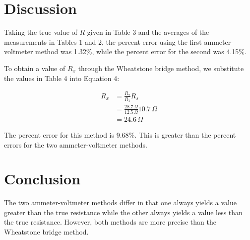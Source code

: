 \documentclass[11pt, titlepage, letterpaper, twoside]{article}
\begin{document}
\section{Discussion}

Taking the true value of $R$ given in Table 3 and the averages of the measurements in Tables 1 and 2, the percent error using the first ammeter-voltmeter
method was 1.32\%, while the percent error for the second was 4.15\%.

To obtain a value of $R_x$ through the Wheatstone bridge method, we substitute the values in Table 4 into Equation 4:

\begin{align*}
  R_x &= \frac{R_2}{R_1} R_s \\
      &= \frac{28.7\,\Omega}{12.5\,\Omega} 10.7\,\Omega \\
      &= 24.6\,\Omega
\end{align*}

The percent error for this method is 9.68\%. This is greater than the percent errors for the two ammeter-voltmeter methods.

\section{Conclusion}
The two ammeter-voltmeter methods differ in that one always yields a value greater than the true resistance while the other always yields a value less than
the true resistance. However, both methods are more precise than the Wheatstone bridge method.
\end{document}
